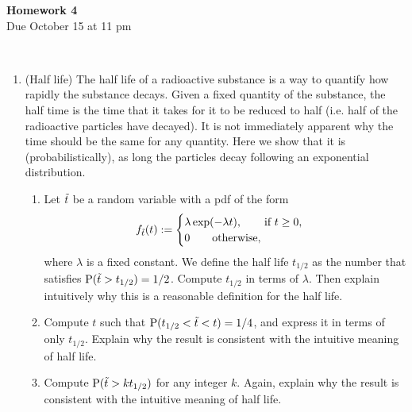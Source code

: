 \documentclass[12pt,twoside]{article}
\begin{document}
\begin{center}
{\large{\textbf{Homework 4}} } \vspace{0.2cm}\\
Due October 15 at 11 pm
\\
\end{center}
\\

\begin{enumerate}

\item (Half life)
The half life of a radioactive substance is a way to quantify how rapidly the substance decays. Given a fixed quantity of the substance, the half time is the time that it takes for it to be reduced to half (i.e. half of the radioactive particles have decayed). It is not immediately apparent why the time should be the same for any quantity. Here we show that it is (probabilistically), as long the particles decay following an exponential distribution.  
\begin{enumerate}
\item Let $\tilde{ t }$ be a random variable with a pdf of the form
\begin{align}
f_{\tilde{ t }}(t) := \begin{cases}
\lambda \exp(- \lambda t), \qquad \text{if $t\geq 0$},\\
0 \qquad \text{otherwise},
\end{cases}
\end{align}
where $\lambda$ is a fixed constant. We define the half life $t_{1/2}$ as the number that satisfies $\mathrm{P}(\tilde{ t } > t_{1/2}) = 1/2$. Compute $t_{1/2}$ in terms of $\lambda$. Then explain intuitively why this is a reasonable definition for the half life.
\item Compute $t$ such that $\mathrm{P}( t_{1/2} < \tilde{ t } < t) = 1/4$, and express it in terms of only $t_{1/2}$. Explain why the result is consistent with the intuitive meaning of half life.
\item Compute $\mathrm{P}( \tilde{ t } > k t_{1/2} )$ for any integer $k$. Again, explain why the result is consistent with the intuitive meaning of half life.
\end{enumerate}


\end{enumerate}
\end{document}
